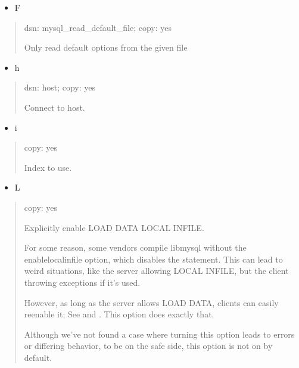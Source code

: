 \documentclass[letterpaper,10pt,english]{sphinxmanual}
\begin{document}
\begin{itemize}
\item {} 
\sphinxAtStartPar
F

\end{itemize}
\begin{quote}

\sphinxAtStartPar
dsn: mysql\_read\_default\_file; copy: yes

\sphinxAtStartPar
Only read default options from the given file
\end{quote}
\begin{itemize}
\item {} 
\sphinxAtStartPar
h

\end{itemize}
\begin{quote}

\sphinxAtStartPar
dsn: host; copy: yes

\sphinxAtStartPar
Connect to host.
\end{quote}
\begin{itemize}
\item {} 
\sphinxAtStartPar
i

\end{itemize}
\begin{quote}

\sphinxAtStartPar
copy: yes

\sphinxAtStartPar
Index to use.
\end{quote}
\begin{itemize}
\item {} 
\sphinxAtStartPar
L

\end{itemize}
\begin{quote}

\sphinxAtStartPar
copy: yes

\sphinxAtStartPar
Explicitly enable LOAD DATA LOCAL INFILE.

\sphinxAtStartPar
For some reason, some vendors compile libmysql without the
\textendash{}enable\sphinxhyphen{}local\sphinxhyphen{}infile option, which disables the statement.  This can
lead to weird situations, like the server allowing LOCAL INFILE, but
the client throwing exceptions if it’s used.

\sphinxAtStartPar
However, as long as the server allows LOAD DATA, clients can easily
re\sphinxhyphen{}enable it; See 
and .
This option does exactly that.

\sphinxAtStartPar
Although we’ve not found a case where turning this option leads to errors or
differing behavior, to be on the safe side, this option is not
on by default.
\end{quote}
\end{document}
